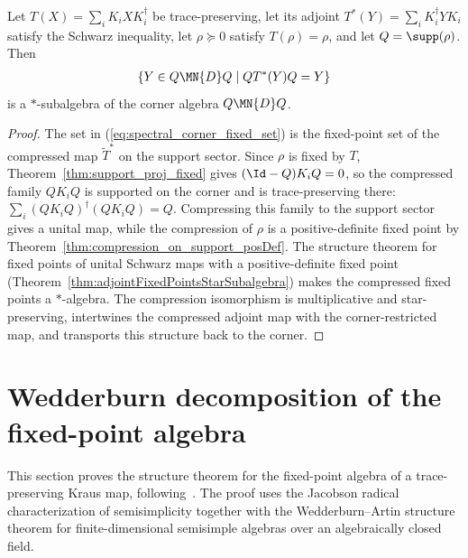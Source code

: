 \begin{theorem}%
    \label{thm:cornerFixedPointsStarSubalgebra}
    \leanok
    Let $T(X)=\sum_iK_iXK_i^\dagger$ be trace-preserving, let its adjoint
    $T^*(Y)=\sum_iK_i^\dagger YK_i$ satisfy the Schwarz inequality, let
    $\rho\succeq0$ satisfy $T(\rho)=\rho$, and let $Q=\supp(\rho)$. Then
    \begin{align}
        \{Y\in Q\MN{D}Q\mid QT^*(Y)Q=Y\}
        \label{eq:spectral_corner_fixed_set}
    \end{align}
    is a $*$-subalgebra of the corner algebra $Q\MN{D}Q$.
\end{theorem}

\begin{proof}
    \leanok
    The set in (\ref{eq:spectral_corner_fixed_set}) is the fixed-point set
    of the compressed map $\widetilde{T}^*$ on the support sector. Since
    $\rho$ is fixed by $T$, Theorem~\ref{thm:support_proj_fixed} gives
    $(\Id-Q)K_iQ=0$, so the compressed family $QK_iQ$ is supported on the
    corner and is trace-preserving there:
    $\sum_i(QK_iQ)^\dagger(QK_iQ)=Q$.
    Compressing this family to the support sector gives a unital map, while
    the compression of $\rho$ is a positive-definite fixed point by
    Theorem~\ref{thm:compression_on_support_posDef}. The structure theorem
    for fixed points of unital Schwarz maps with a positive-definite fixed
    point (Theorem~\ref{thm:adjointFixedPointsStarSubalgebra}) makes the
    compressed fixed points a $*$-algebra. The compression isomorphism is
    multiplicative and star-preserving, intertwines the compressed adjoint
    map with the corner-restricted map, and transports this structure back
    to the corner.
\end{proof}

\section{Wedderburn decomposition of the fixed-point algebra}

This section proves the structure theorem for the fixed-point algebra of a
trace-preserving Kraus map,
following~\cite[Theorems~6.12--6.14]{Wolf2012Quantum}. The proof uses the
Jacobson radical characterization of semisimplicity together with the
Wedderburn--Artin structure theorem for finite-dimensional semisimple
algebras over an algebraically closed field.

